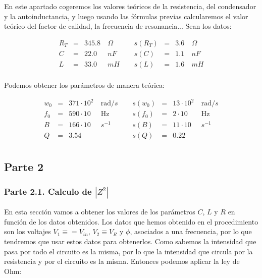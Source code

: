 \documentclass[12pt,a4paper]{article}
\newcommand{\Hz}{\mathrm{Hz} }
\begin{document}
En este apartado cogeremos los valores teóricos de la resistencia, del condensador y la autoinductancia, y luego usando las fórmulas previas calcularemos el valor teórico del factor de calidad, la frecuencia de resonancia... Sean los datos:


\begin{equation} 
\begin{array}{lllllllll}
R_T & = & 345.8 & \ \Omega &  \ \ &  s(R_T) & =  & 3.6 & \ \Omega \\ 
C & = & 22.0 & \ nF &  \ \ &  s(C) & =  & 1.1 & \ nF \\ 
L & = & 33.0 & \ mH &  \ \ &  s(L) & =  & 1.6 & \ mH \\ 
\end{array} 
\end{equation} 

Podemos obtener los parámetros de manera teórica:

\begin{equation} 
\begin{array}{lllllllll}
w_0 & = & 371 \cdot 10^{2} & \ \mathrm{rad}/s &  \ \ &  s(w_0) & =  & 13 \cdot 10^{2} & \ \mathrm{rad}/s \\ 
f_0 & = & 590 \cdot 10 & \ \Hz &  \ \ &  s(f_0) & =  & 2 \cdot 10 & \ \Hz \\ 
B & = & 166 \cdot 10 & \ s^{-1} &  \ \ &  s(B) & =  & 11  \cdot 10 & \ s^{-1} \\ 
Q & = & 3.54  &   \ & \ &  s(Q) & =  & 0.22 & \\ 
\end{array} 
\end{equation} 
 
 
\subsection{Parte 2} 

\subsubsection{Parte 2.1. Calculo de $|Z^2|$}

En esta sección vamos a obtener los valores de los parámetros $C$, $L$ y $R$ en función de los datos obtenidos. Los datos que hemos obtenido en el procedimiento son los voltajes $V_1 \equiv = V_{in}$, $V_2 \equiv V_R$ y $\phi$, asociados a una frecuencia, por lo que tendremos que usar estos datos para obtenerlos. Como sabemos la intensidad que pasa por todo el circuito es la misma, por lo que la intensidad que circula por la resistencia y por el circuito es la misma. Entonces podemos aplicar la ley de Ohm:
\end{document}
